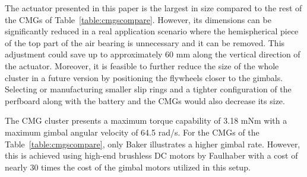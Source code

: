 \documentclass[aerospace,article,submit,moreauthors,dvi2pdf]{Definitions/mdpi}
\begin{document}
\begin{paracol}{2}
\linenumbers
\switchcolumn

The actuator presented in this paper is the largest in size compared to the rest of the CMGs of Table~\ref{table:cmgscompare}. However, its dimensions can be significantly reduced in a real application scenario where the hemispherical piece of the top part of the air bearing is unnecessary and it can be removed. This adjustment could save up to approximately 60 mm along the vertical direction of the actuator. Moreover, it is feasible to further reduce the size of the whole cluster in a future version by positioning the flywheels closer to the gimbals. Selecting or manufacturing smaller slip rings and a tighter configuration of the perfboard along with the battery and the CMGs would also decrease its size.

The CMG cluster presents a maximum torque capability of 3.18 mNm with a maximum gimbal angular velocity of 64.5 rad/s. For the CMGs of the Table~\ref{table:cmgscompare}, only Baker illustrates a higher gimbal rate. However, this is achieved using high-end brushless DC motors by Faulhaber with a cost of nearly 30 times the cost of the gimbal motors utilized in this setup.





\end{paracol}
\end{document}
